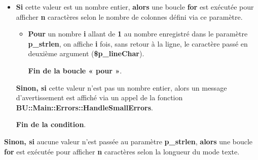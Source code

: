 \documentclass[a4paper,10pt]{article}
\begin{document}
\begin{itemize}
    \item
    {
        \begin{justify}
            \textbf{\color{brick}Si} cette valeur est un nombre entier, \textbf{\color{brick}alors} une boucle \textbf{\color{cyan}for} est exécutée pour afficher \textbf{n} caractères selon le nombre de colonnes défini via ce paramètre.\setlength{\parskip}{2em}
        \end{justify}

        \setlength{\parskip}{1em}

        \begin{itemize}
            \item
            {
                \begin{justify}
                    \textbf{\color{cyan}Pour} un nombre \textbf{\color{orange}i} allant de \textbf{\color{cyan}1} au nombre enregistré dans le paramètre \textbf{\color{orange}p\_strlen}, on affiche \textbf{\color{orange}i} fois, sans retour à la ligne, le caractère passé en deuxième argument (\textbf{\color{orange}\$p\_lineChar}).
                \end{justify}\setlength{\parskip}{1em}

                \begin{justify}
                    \textbf{\color{cyan}Fin de la boucle « pour »}.
                \end{justify}
            }
        \end{itemize}

        \begin{justify}
            \textbf{\color{brick}Sinon, si} cette valeur n'est pas un nombre entier, alors un message d'avertissement est affiché via un appel de la fonction \textbf{\color{mauve}BU::Main::Errors::HandleSmallErrors}.
        \end{justify}

        \setlength{\parskip}{1em}

        \begin{justify}
            \textbf{\color{brick}Fin de la condition}.
        \end{justify}
        
        \setlength{\parskip}{1em}
    }
\end{itemize}


\begin{justify}
    \textbf{\color{brick}Sinon, si} aucune valeur n'est passée au paramètre \textbf{\color{orange}p\_strlen}, \textbf{\color{brick}alors} une boucle \textbf{\color{cyan}for} est exécutée pour afficher \textbf{n} caractères selon la longueur du mode texte.
\end{justify}\setlength{\parskip}{1em}
\end{document}

